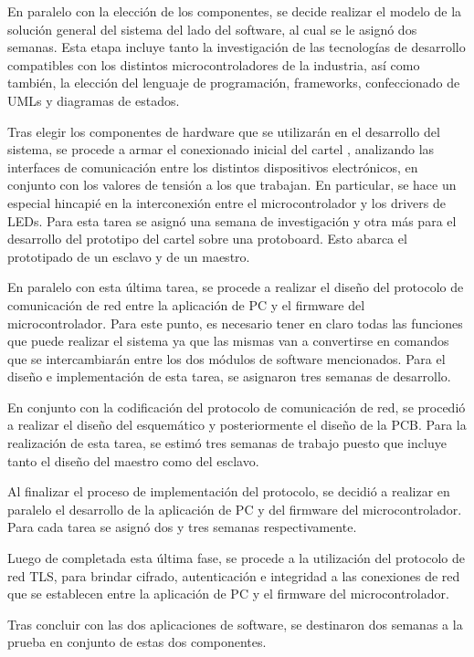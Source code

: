 En paralelo con la elección de los componentes, se decide realizar el modelo de la solución general del sistema del lado del software, al cual se le asignó dos semanas. Esta etapa incluye tanto la investigación de las tecnologías de desarrollo compatibles con los distintos microcontroladores de la industria, así como también, la elección del lenguaje de programación, frameworks, confeccionado de UMLs y diagramas de estados.

Tras elegir los componentes de hardware que se utilizarán en el desarrollo del sistema, se procede a armar el conexionado inicial del cartel , analizando las interfaces de comunicación entre los distintos dispositivos electrónicos, en conjunto con los valores de tensión a los que trabajan.
En particular, se hace un especial hincapié en la interconexión entre el microcontrolador y los drivers de LEDs.
Para esta tarea se asignó una semana de investigación y otra más para el desarrollo del prototipo del cartel sobre una protoboard. Esto abarca el prototipado de un esclavo y de un maestro.

En paralelo con esta última tarea, se procede a realizar el diseño del protocolo de comunicación de red entre la aplicación de PC y el firmware del microcontrolador. Para este punto, es necesario tener en claro todas las funciones que puede realizar el sistema ya que las mismas van a convertirse en comandos que se intercambiarán entre los dos módulos de software mencionados. Para el diseño e implementación de esta tarea, se asignaron tres semanas de desarrollo.

En conjunto con la codificación del protocolo de comunicación de red, se procedió a realizar el diseño del esquemático y posteriormente el diseño de la PCB. Para la realización de esta tarea, se estimó tres semanas de trabajo puesto que incluye tanto el diseño del maestro como del esclavo.

Al finalizar el proceso de implementación del protocolo, se decidió a realizar en paralelo el desarrollo de la aplicación de PC y del firmware del microcontrolador. Para cada tarea se asignó dos y tres semanas respectivamente.

Luego de completada esta última fase, se procede a la utilización del protocolo de red TLS, para brindar cifrado, autenticación e integridad a las conexiones de red que se establecen entre la aplicación de PC y el firmware del microcontrolador.

Tras concluir con las dos aplicaciones de software, se destinaron dos semanas a la prueba en conjunto de estas dos componentes.

